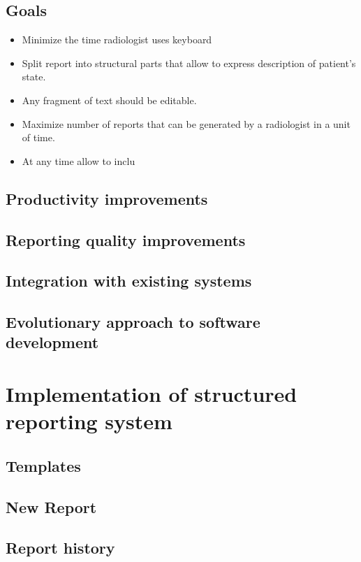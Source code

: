 \documentclass[12pt, twoside, openany]{report}
\theoremstyle{definition}
\begin{document}
\section{Goals}
\begin{itemize}
\item Minimize the time radiologist uses keyboard
\item Split report into structural parts that allow to express description of patient's state.
\item Any fragment of text should be editable. 
\item Maximize number of reports that can be generated by a radiologist in a unit of time.
\item At any time allow to inclu
\end{itemize}


\section{Productivity improvements}

\section{Reporting quality improvements}

\section{Integration with existing systems}

\section{Evolutionary approach to software development}

\chapter{Implementation of structured reporting system}


\section{Templates}
\section{New Report}
\section{Report history}
\end{document}
